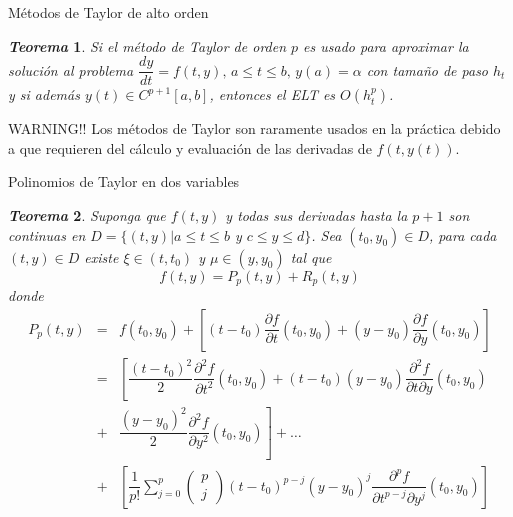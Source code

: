 \documentclass{beamer}
\newtheorem{teorema}{\textit{\textbf{Teorema}}}
\begin{document}
\begin{frame}{Métodos de Taylor de alto orden}

\begin{teorema}
Si el método de Taylor de orden $p$ es usado para aproximar la solución al problema
$\dfrac{dy}{dt} = f(t,y), \, a \leq t \leq b, \, y(a) = \alpha $ 
con tamaño de paso $h_t$  y si además $y(t) \in C^{p+1}[a,b]$, entonces el ELT es $O(h_t^p)$.
\end{teorema}

\pause

\begin{alertblock}{WARNING!!}
Los métodos de Taylor son raramente usados en la práctica debido a que requieren del cálculo y evaluación de las derivadas de $f(t,y(t))$.
\end{alertblock}

\end{frame}

\begin{frame}{Polinomios de Taylor en dos variables}

{\footnotesize 
\begin{teorema}
Suponga que $f(t,y)$ y todas sus derivadas hasta la $p+1$ son continuas en $D=\{(t,y) | a \leq t \leq b$ y $c \leq y \leq d \}$. Sea $(t_0, y_0) \in D$, para cada $(t,y) \in D$ existe $\xi \in (t, t_0)$ y $\mu \in (y,y_0)$ tal que 
\begin{displaymath}
f(t,y) = P_p(t,y) + R_p(t,y)
\end{displaymath}
donde
\begin{eqnarray*}
P_p(t,y) & = & f(t_0,y_0) + \left[(t-t_0)\dfrac{\partial f}{\partial t}(t_0,y_0) + (y-y_0)\dfrac{\partial f}{\partial y}(t_0,y_0)   \right] \\
& = &  \left[\dfrac{(t-t_0)^2}{2}\dfrac{\partial^2 f}{\partial t^2}(t_0,y_0) +
(t-t_0)(y-y_0) \dfrac{\partial^2 f}{\partial t \partial y}(t_0,y_0)  \right. \\
& + & \left. \dfrac{(y-y_0)^2}{2}\dfrac{\partial^2 f}{\partial y^2}(t_0,y_0)   \right] + \dots \\
& + & \left[ \dfrac{1}{p!} \sum\limits_{j = 0}^p \left( \begin{matrix}p \\ j \end{matrix}\right) (t-t_0)^{p-j}(y-y_0)^{j} \dfrac{\partial^p f}{\partial t^{p-j} \partial y^j}(t_0,y_0)
\right]
\end{eqnarray*}

\end{teorema}
}
\end{frame}
\end{document}
